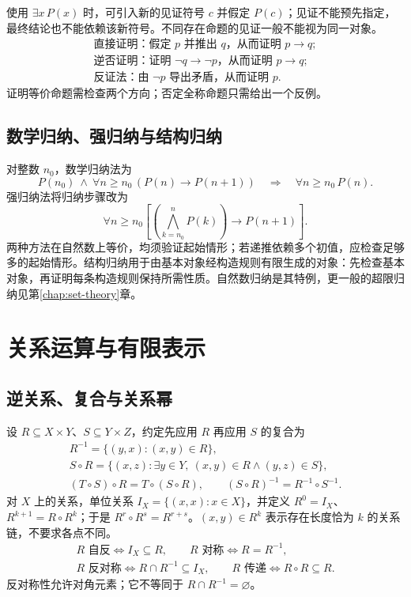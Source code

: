 \documentclass[../main.tex]{subfiles}
\begin{document}
使用 $\exists x\,P(x)$ 时，可引入新的见证符号 $c$ 并假定 $P(c)$；见证不能预先指定，最终结论也不能依赖该新符号。不同存在命题的见证一般不能视为同一对象。
\begin{gather*}
\text{直接证明：假定 }p\text{ 并推出 }q\text{，从而证明 }p\to q;\\
\text{逆否证明：证明 }\neg q\to\neg p\text{，从而证明 }p\to q;\\
\text{反证法：由 }\neg p\text{ 导出矛盾，从而证明 }p.
\end{gather*}
证明等价命题需检查两个方向；否定全称命题只需给出一个反例。

\subsection{数学归纳、强归纳与结构归纳}
对整数 $n_0$，数学归纳法为
\[
P(n_0)\ \land\ \forall n\ge n_0\,(P(n)\to P(n+1))
\quad\Longrightarrow\quad\forall n\ge n_0\,P(n).
\]
强归纳法将归纳步骤改为
\[
\forall n\ge n_0\left[\left(\bigwedge_{k=n_0}^{n}P(k)\right)\to P(n+1)\right].
\]
两种方法在自然数上等价，均须验证起始情形；若递推依赖多个初值，应检查足够多的起始情形。结构归纳用于由基本对象经构造规则有限生成的对象：先检查基本对象，再证明每条构造规则保持所需性质。自然数归纳是其特例，更一般的超限归纳见第\ref{chap:set-theory}章。

\section{关系运算与有限表示}
\subsection{逆关系、复合与关系幂}
设 $R\subseteq X\times Y$、$S\subseteq Y\times Z$，约定先应用 $R$ 再应用 $S$ 的复合为
\begin{gather*}
R^{-1}=\{(y,x):(x,y)\in R\},\\
S\circ R=\{(x,z):\exists y\in Y,\ (x,y)\in R\land(y,z)\in S\},\\
(T\circ S)\circ R=T\circ(S\circ R),\qquad
(S\circ R)^{-1}=R^{-1}\circ S^{-1}.
\end{gather*}
对 $X$ 上的关系，单位关系 $I_X=\{(x,x):x\in X\}$，并定义 $R^0=I_X$、$R^{k+1}=R\circ R^k$；于是 $R^r\circ R^s=R^{r+s}$。$(x,y)\in R^k$ 表示存在长度恰为 $k$ 的关系链，不要求各点不同。
\begin{gather*}
R\text{ 自反}\iff I_X\subseteq R,\qquad
R\text{ 对称}\iff R=R^{-1},\\
R\text{ 反对称}\iff R\cap R^{-1}\subseteq I_X,\qquad
R\text{ 传递}\iff R\circ R\subseteq R.
\end{gather*}
反对称性允许对角元素；它不等同于 $R\cap R^{-1}=\varnothing$。
\end{document}
